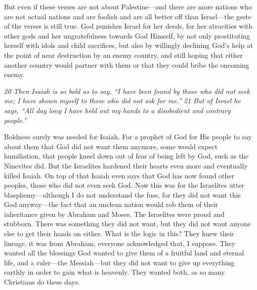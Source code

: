 But even if these verses are not about Palestine---and there are more
nations who are not actual nations and are foolish and are all better
off than Israel---the geste of the verses is still true. God punishes
Israel for her deeds, for her atrocities with other gods and her
ungratefulness towards God Himself, by not only prostituting herself
with idols and child sacrifices, but also by willingly declining God's
help at the point of near destruction by an enemy country, and still
hoping that either another country would partner with them or that they
could bribe the oncoming enemy.

\emph{20 Then Isaiah is so bold as to say,} \emph{``I have been found by
those who did not seek me;\emph{ }I have shown myself to those who did
not ask for me.''} \emph{21 But of Israel he says, ``All day long I have
held out my hands to a disobedient and contrary people.''}

Boldness surely was needed for Isaiah. For a prophet of God for His
people to say about them that God did not want them anymore, some would
expect humiliation, that people kneel down out of fear of being left by
God, such as the Ninevites did. But the Israelites hardened their hearts
even more and eventually killed Isaiah. On top of that Isaiah even says
that God has now found other peoples, those who did not even seek God.
Now this was for the Israelites utter blasphemy---although I do not
understand the fuss, for they did not want this God anyway---the fact
that an unclean nation would rob them of their inheritance given by
Abraham and Moses. The Israelites were proud and stubborn. There was
something they did not want, but they did not want anyone else to get
their hands on either. What is the logic in this? They knew their
lineage, it was from Abraham, everyone acknowledged that, I suppose.
They wanted all the blessings God wanted to give them of a fruitful land
and eternal life, and a ruler---the Messiah---but they did not want to
give up everything earthly in order to gain what is heavenly. They
wanted both, as so many Christians do these days.

